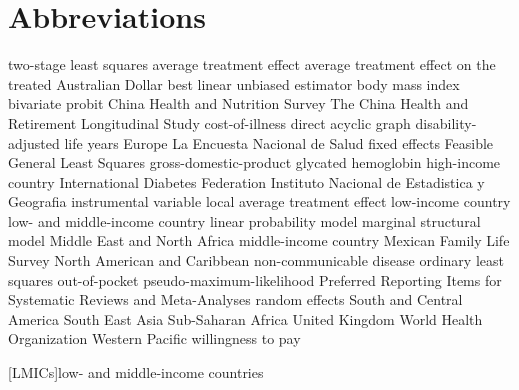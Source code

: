 \cleardoublepage
{}
\chapter*{\label{abbreviations}Abbreviations}

\begin{acronym}
 {two-stage least squares}
 {average treatment effect}
 {average treatment effect on the treated}
 {Australian Dollar}
 {best linear unbiased estimator}
 {body mass index}  
 {bivariate probit}
 {China Health and Nutrition Survey}
 {The China Health and Retirement Longitudinal Study}
 {cost-of-illness} 
 {direct acyclic graph}
 {disability-adjusted life years}
 {Europe}
 {La Encuesta Nacional de Salud}
 {fixed effects}  
 {Feasible General Least Squares}
 {gross-domestic-product} 
 {glycated hemoglobin}  
 {high-income country} 
 {International Diabetes Federation}
 {Instituto Nacional de Estadistica y Geografia} 
 {instrumental variable}
\DIFaddbegin {}
\DIFaddend {} {local average treatment effect}
 {low-income country} 
 {low- and middle-income country} 
 {linear probability model}
 {marginal structural model} 
 {Middle East and North Africa}
 {middle-income country}  
 {Mexican Family Life Survey}
 {North American and Caribbean}
 {non-communicable disease}
 {ordinary least squares}
 {out-of-pocket}   
 {pseudo-maximum-likelihood}
 {Preferred Reporting Items for Systematic Reviews and Meta-Analyses}
 {random effects}
 {South and Central America}
 {South East Asia}
 {Sub-Saharan Africa}
 {United Kingdom}
 {World Health Organization}
 {Western Pacific}
 {willingness to pay}    

\end{acronym}

[LMICs]{low- and middle-income countries}  

